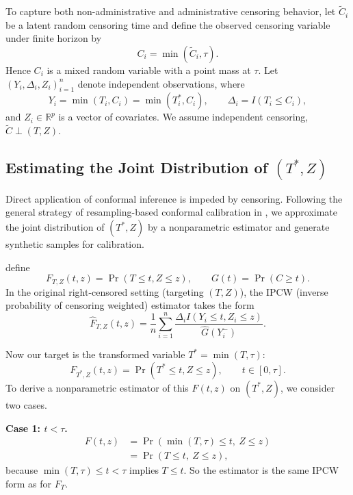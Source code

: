 \documentclass[12pt]{article}
\makeatletter
\let\thesis@section\subsection
\let\thesis@subsection\subsubsection
\renewcommand{\section}{\thesis@section}
\renewcommand{\subsection}{\thesis@subsection}
\makeatother
\begin{document}
To capture both non-administrative and administrative censoring behavior, let $\widetilde C_i$ be a latent random censoring time and define the observed
censoring variable under finite horizon by
\[
C_i = \min(\widetilde C_i,\tau).
\]
Hence $C_i$ is a mixed random variable with a point mass at $\tau$.
Let $(Y_i,\Delta_i,Z_i)_{i=1}^n$ denote independent observations, where
\[
Y_i = \min(T_i, C_i) = \min(T_i^*, C_i), \qquad
\Delta_i = I(T_i \le C_i),
\]
and $Z_i \in \mathbb R^p$ is a vector of covariates.
We assume independent censoring,
$\widetilde C \perp (T,Z)$.

\section{Estimating the Joint Distribution of $(T^*,Z)$}
Direct application of conformal inference is impeded by censoring.
Following the general strategy of resampling-based conformal calibration in \citet{qin2025conformal}, we approximate the joint distribution of $(T^*,Z)$ by a nonparametric estimator and generate synthetic samples for calibration.

\citet{qin2025conformal} define
\[
F_{T,Z}(t,z)=\Pr(T\le t, Z\le z), \qquad G(t)=\Pr(C\ge t).
\]
In the original right-censored setting (targeting $(T,Z)$), the IPCW (inverse probability of censoring weighted) estimator
 takes the form
\[
\widehat F_{T,Z}(t,z)=\frac{1}{n}\sum_{i=1}^n
\frac{\Delta_i I(Y_i\le t, Z_i\le z)}{\widehat G(Y_i^-)}.
\]

Now our target is the transformed variable $T^*=\min(T,\tau)$:
\[
F_{T^*,Z}(t,z)=\Pr(T^*\le t, Z\le z), \qquad t\in[0,\tau].
\]
To derive a nonparametric estimator of this $F(t,z)$ on $(T^*,Z)$, we consider two cases.

\textbf{Case 1: $t<\tau$.}
\[
\begin{aligned}
F(t,z)
&=\Pr(\min(T,\tau)\le t,\ Z\le z) \\
&=\Pr(T\le t,\ Z\le z),
\end{aligned}
\]
because $\min(T,\tau)\le t<\tau$ implies $T\le t$.
So the estimator is the same IPCW form as for $F_T$.
\end{document}
